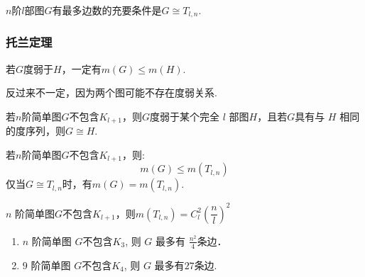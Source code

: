 \begin{theorem}
	$n$阶$l$部图$G$有最多边数的充要条件是$G \cong  T_{l, n}$.
\end{theorem}



\subsubsection{托兰定理}

\begin{theorem}
	若$G$度弱于$H$，一定有$m(G)\leq m(H)$.
\end{theorem}
\begin{note}
	反过来不一定，因为两个图可能不存在度弱关系.
\end{note}
\begin{theorem}
	若$n$阶简单图$G$不包含$K_{l+1}$，则$G$度弱于某个完全 $l$
	部图$H$，且若$G$具有与 $H$ 相同的度序列，则$G \cong H$.
\end{theorem}
\begin{theorem}[托兰定理]
	若$n$阶简单图$G$不包含$K_{l+1}$，则:
	\[
	m(G)\leq m(T_{l, n})
	\]
	仅当$G \cong  T_{l, n}$时，有$m(G)= m(T_{l, n})$.
\end{theorem}

\begin{theorem}
$n$ 阶简单图$G$不包含$K_{l+1}$，则$m(T_{l, n})=C_{l}^{2}\left(\dfrac{n}{l}\right)^2$
\end{theorem}
\begin{example}
	
	\begin{enumerate}
		\item $n$ 阶简单图 $G$不包含$K_3$, 则 $G$ 最多有 $\frac{n^2}{4}$条边．
		\item $9$ 阶简单图 $G$不包含$K_4$, 则 $G$ 最多有$27$条边.
	\end{enumerate}
\end{example}











